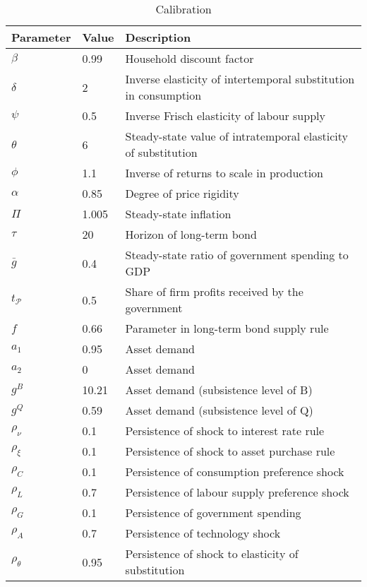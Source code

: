 \documentclass[12pt]{article}
\begin{document}
\begin{table}
    \caption{Calibration}
    \label{tb:cal}
    \begin{tabular}{lll}
        \hline Parameter & Value & Description \\ \hline
        $\beta$ & 0.99 & Household discount factor \\
        $\delta$ & 2 & Inverse elasticity of intertemporal substitution in consumption \\
        $\psi$ & 0.5 & Inverse Frisch elasticity of labour supply \\
        $\theta$ & 6 & Steady-state value of intratemporal elasticity of substitution \\
        $\phi$ & 1.1 & Inverse of returns to scale in production \\
        $\alpha$ & 0.85 & Degree of price rigidity \\
        $\Pi$ & 1.005 & Steady-state inflation \\
        $\tau$ & 20 & Horizon of long-term bond \\
        $\bar{g}$ & 0.4 & Steady-state ratio of government spending to GDP \\
        $t_{\mathcal{P}}$ & 0.5 & Share of firm profits received by the government \\
        $f$ & 0.66 & Parameter in long-term bond supply rule \\
        $a_1$ & 0.95 & Asset demand \\
        $a_2$ & 0 & Asset demand \\
        $g^B$ & 10.21 & Asset demand (subsistence level of B) \\
        $g^Q$ & 0.59 & Asset demand (subsistence level of Q) \\
        $\rho_\nu$ & 0.1 & Persistence of shock to interest rate rule \\
        $\rho_{\xi}$ & 0.1 & Persistence of shock to asset purchase rule \\
        $\rho_C$ & 0.1 & Persistence of consumption preference shock \\
        $\rho_L$ & 0.7 & Persistence of labour supply preference shock \\
        $\rho_G$ & 0.1 & Persistence of government spending \\
        $\rho_A$ & 0.7 & Persistence of technology shock \\
        $\rho_\theta$ & 0.95 & Persistence of shock to elasticity of substitution \\

\end{tabular}
\end{table}
\end{document}
